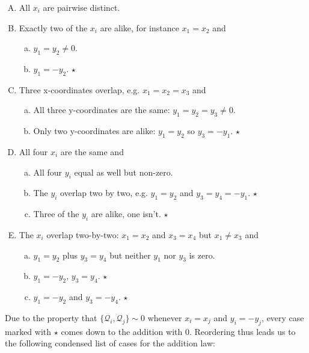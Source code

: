 \documentclass[english,11pt,a4paper]{article}
\theoremstyle{definition}
\theoremstyle{remark}
\theoremstyle{case}
\newcommand{\q}{\mathcal{Q}}
\begin{document}
\begin{enumerate}[A.]
	\parskip 1mm
	\item All $x_i$ are pairwise distinct.
	\item Exactly two of the $x_i$ are alike, for instance $x_1=x_2$ and
	\begin{enumerate}[a.]
		\item $y_1 = y_2 \neq 0$.
		\item $y_1 = -y_2$. \hfill $\star$
	\end{enumerate}
	\item Three x-coordinates overlap, e.g. $x_1=x_2=x_3$ and
	\begin{enumerate}[a.]
		\item All three y-coordinates are the same: $y_1 = y_2 = y_3 \neq 0$.
		\item Only two y-coordinates are alike: $y_1 = y_2$ so $y_3=-y_1$. \hfill $\star$
	\end{enumerate}
	\item All four $x_i$ are the same and
	\begin{enumerate}[a.]
		\item All four $y_i$ equal as well but non-zero.
		\item The $y_i$ overlap two by two, e.g. $y_1=y_2$ and $y_3=y_4=-y_1$. \hfill $\star$
		\item Three of the $y_i$ are alike, one isn't. \hfill $\star$
	\end{enumerate}
	\item The $x_i$ overlap two-by-two: $x_1=x_2$ and $x_3=x_4$ but $x_1 \neq x_3$ and
	\begin{enumerate}[a.]
		\item $y_1 = y_2$ plus $y_3=y_4$ but neither $y_1$ nor $y_3$ is zero.
		\item $y_1 = -y_2$, $y_3=y_4$. \hfill $\star$
		\item $y_1 = -y_2$ and $y_3=-y_4$. \hfill $\star$
	\end{enumerate}
\end{enumerate}

Due to the property that $\{ \q_i, \q_j \} \sim 0$ whenever $x_i=x_j$ and $y_i = -y_j$, every case marked with $\star$ comes down to the addition with 0. Reordering thus leads us to the following condensed list of cases for the addition law:
\end{document}

